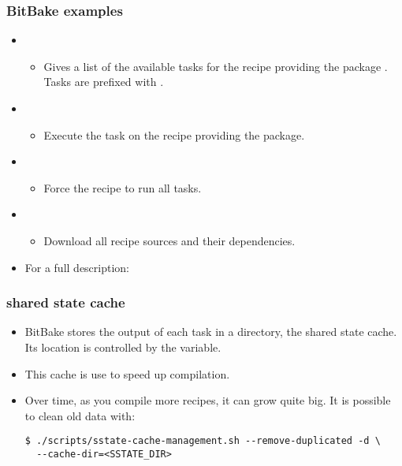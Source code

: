 \begin{frame}
  \frametitle{BitBake examples}
  \begin{itemize}
    \item {}
    \begin{itemize}
      \item Gives a list of the available tasks for the recipe
        providing the package . Tasks are
        prefixed with .
    \end{itemize}
    \item {}
    \begin{itemize}
      \item Execute the task  on the recipe providing
        the  package.
    \end{itemize}
    \item {}
    \begin{itemize}
      \item Force the  recipe to run all tasks.
    \end{itemize}
    \item {}
    \begin{itemize}
      \item Download all recipe sources and their dependencies.
    \end{itemize}
    \item For a full description: 
  \end{itemize}
\end{frame}

\begin{frame}[fragile]
  \frametitle{shared state cache}
  \begin{itemize}
    \item BitBake stores the output of each task in a directory, the
      shared state cache. Its location is controlled by the
       variable.
    \item This cache is use to speed up compilation.
    \item Over time, as you compile more recipes, it can grow quite
      big. It is possible to clean old data with:
      \begin{block}{}
        \begin{verbatim}
$ ./scripts/sstate-cache-management.sh --remove-duplicated -d \
  --cache-dir=<SSTATE_DIR>
        \end{verbatim}
      \end{block}
  \end{itemize}
\end{frame}
